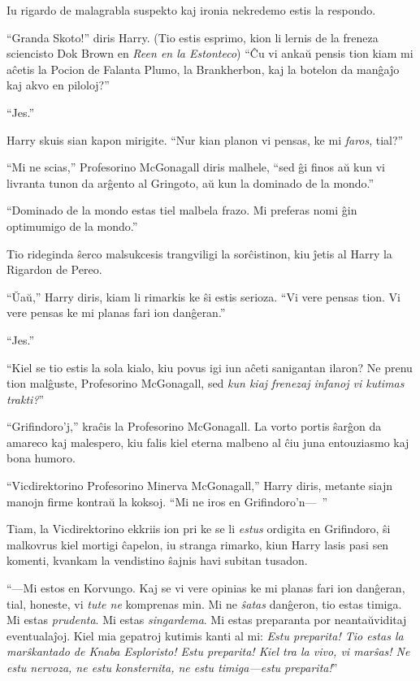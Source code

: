 Iu rigardo de malagrabla suspekto kaj ironia nekredemo estis la respondo.

``Granda Skoto!'' diris Harry. (Tio estis esprimo, kion li lernis de
la freneza sciencisto Dok Brown en \emph{Reen en la Estonteco}) ``Ĉu vi
ankaŭ pensis tion kiam mi aĉetis la Pocion de Falanta Plumo, la
Brankherbon, kaj la botelon da manĝaĵo kaj akvo en piloloj?''

``Jes.''

Harry skuis sian kapon mirigite. ``Nur kian planon vi pensas, ke mi
\emph{faros}, tial?''

``Mi ne scias,'' Profesorino McGonagall diris malhele, ``sed ĝi finos
aŭ kun vi livranta tunon da arĝento al Gringoto, aŭ kun la dominado de
la mondo.''

``Dominado de la mondo estas tiel malbela frazo. Mi preferas nomi ĝin
optimumigo de la mondo.''

Tio rideginda ŝerco malsukcesis trangviligi la sorĉistinon, kiu ĵetis
al Harry la Rigardon de Pereo.

``Ŭaŭ,'' Harry diris, kiam li rimarkis ke ŝi estis serioza. ``Vi vere
pensas tion. Vi vere pensas ke mi planas fari ion danĝeran.''

``Jes.''

``Kiel se tio estis la sola kialo, kiu povus igi iun aĉeti sanigantan
ilaron? Ne prenu tion malĝuste, Profesorino McGonagall, sed \emph{kun
kiaj frenezaj infanoj vi kutimas trakti?}''

``Grifindoro'j,'' kraĉis la Profesorino McGonagall. La vorto portis
ŝarĝon da amareco kaj malespero, kiu falis kiel eterna malbeno al ĉiu
juna entouziasmo kaj bona humoro.

``Vicdirektorino Profesorino Minerva McGonagall,'' Harry diris,
metante siajn manojn firme kontraŭ la koksoj. ``Mi ne iros en
Grifindoro'n—~''

Tiam, la Vicdirektorino ekkriis ion pri ke se li \emph{estus} ordigita
en Grifindoro, ŝi malkovrus kiel mortigi ĉapelon, iu stranga rimarko,
kiun Harry lasis pasi sen komenti, kvankam la vendistino ŝajnis havi
subitan tusadon.

``—Mi estos en Korvungo. Kaj se vi vere opinias ke mi planas fari ion
danĝeran, tial, honeste, vi \emph{tute ne} komprenas min. Mi ne
\emph{ŝatas} danĝeron, tio estas timiga. Mi estas \emph{prudenta}. Mi
estas \emph{singardema}. Mi estas preparanta por neantaŭviditaj
eventualaĵoj. Kiel mia gepatroj kutimis kanti al mi: \emph{Estu
preparita! Tio estas la marŝkantado de Knaba Esploristo!  Estu
preparita! Kiel tra la vivo, vi marŝas! Ne estu nervoza, ne estu
konsternita, ne estu timiga—estu preparita!}''

